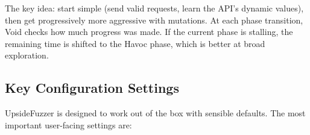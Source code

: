 \documentclass[conference]{IEEEtran}
\begin{document}
\begin{table}[htbp]
\caption{Void Fuzzing Campaign Epochs}
\label{tab:epochs}
\centering
\footnotesize
\setlength{\tabcolsep}{4pt}
\end{table}

The key idea: start simple (send valid requests, learn the API's dynamic values), then get progressively more aggressive with mutations. At each phase transition, Void checks how much progress was made. If the current phase is stalling, the remaining time is shifted to the Havoc phase, which is better at broad exploration.

\subsection{Key Configuration Settings}
\label{sec:settings}

UpsideFuzzer is designed to work out of the box with sensible defaults. The most important user-facing settings are:
\end{document}
